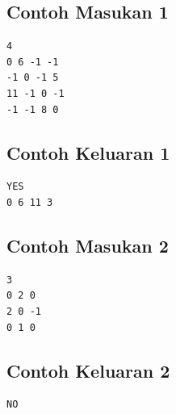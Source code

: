 \documentclass{article}
\begin{document}
\begin{multicols}{2}
\subsection*{Contoh Masukan 1}
\begin{lstlisting}
4
0 6 -1 -1
-1 0 -1 5  
11 -1 0 -1 
-1 -1 8 0
\end{lstlisting}
\columnbreak

\subsection*{Contoh Keluaran 1}
\begin{lstlisting}
YES
0 6 11 3
\end{lstlisting}
\vfill
\null
\end{multicols}

\begin{multicols}{2}
\subsection*{Contoh Masukan 2}
\begin{lstlisting}
3
0 2 0
2 0 -1
0 1 0
\end{lstlisting}
\columnbreak

\subsection*{Contoh Keluaran 2}
\begin{lstlisting}
NO
\end{lstlisting}
\vfill
\null
\end{multicols}

\pagebreak
\end{document}
